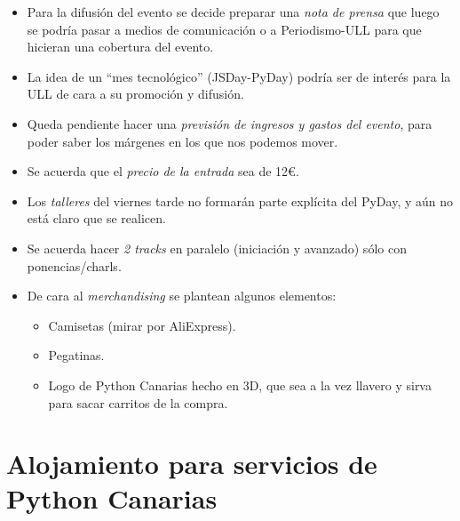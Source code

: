 \documentclass[a4paper, 12pt]{article}
\begin{document}
\begin{itemize}
    \item Para la difusión del evento se decide preparar una \textit{nota de prensa} que luego se podría pasar a medios de comunicación o a Periodismo-ULL para que hicieran una cobertura del evento.
    \item La idea de un ``mes tecnológico'' (JSDay-PyDay) podría ser de interés para la ULL de cara a su promoción y difusión.
    \item Queda pendiente hacer una \textit{previsión de ingresos y gastos del evento}, para poder saber los márgenes en los que nos podemos mover.
    \item Se acuerda que el \textit{precio de la entrada} sea de 12\euro.
    \item Los \textit{talleres} del viernes tarde no formarán parte explícita del PyDay, y aún no está claro que se realicen.
    \item Se acuerda hacer \textit{2 tracks} en paralelo (iniciación y avanzado) sólo con ponencias/charls.
    \item De cara al \textit{merchandising} se plantean algunos elementos:
    \begin{itemize}
        \item Camisetas (mirar por AliExpress).
        \item Pegatinas.
        \item Logo de Python Canarias hecho en 3D, que sea a la vez llavero y sirva para sacar carritos de la compra.
    \end{itemize}
\end{itemize}

\section{Alojamiento para servicios de Python Canarias}
\end{document}
